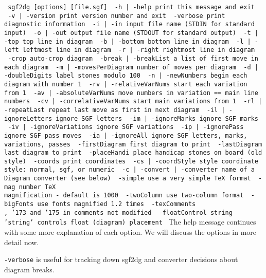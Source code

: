 \bigbreak
{\tt\parskip=0pt\parindent=5pt\obeylines\obeyspaces\hsize=400pt
\def\[{{\char'173}}
\def\]{{\char'175}}
sgf2dg [options] [file.sgf]
\medskip
\ -h | -help                 print this message and exit
\ -v | -version              print version number and exit
\ -verbose                   print diagnostic information
\ -i | -in                   input file name (STDIN for standard input)
\ -o | -out                  output file name (STDOUT for standard output)
\ -t | -top                  top line in diagram
\ -b | -bottom               bottom line in diagram
\ -l | -left                 leftmost line in diagram
\ -r | -right                rightmost line in diagram
\ -crop                      auto-crop diagram
\ -break | -breakList        a list of first move in each diagram
\ -m | -movesPerDiagram      number of moves per diagram
\ -d | -doubleDigits         label stones modulo 100
\ -n | -newNumbers           begin each diagram with number 1
\ -rv | -relativeVarNums     start each variation from 1
\ -av | -absoluteVarNums     move numbers in variation == main line numbers
\ -cv | -correlativeVarNums  start main variations from 1 
\ -rl | -repeatLast          repeat last move as first in next diagram
\ -il | -ignoreLetters       ignore SGF letters
\ -im | -ignoreMarks         ignore SGF marks
\ -iv | -ignoreVariations    ignore SGF variations
\ -ip | -ignorePass          ignore SGF pass moves
\ -ia | -ignoreAll           ignore SGF letters, marks, variations, passes
\ -firstDiagram              first diagram to print
\ -lastDiagram               last diagram to print
\ -placeHandi                place handicap stones on board (old style)
\ -coords                    print coordinates
\ -cs | -coordStyle style    coordinate style: normal, sgf, or numeric
\ -c | -convert | -converter name of a Diagram converter (see below)
\ -simple                    use a very simple TeX format
\ -mag number                TeX \\magnification - default is 1000
\ -twoColumn                 use two-column format
\ -bigFonts                  use fonts magnified 1.2 times
\ -texComments               \\, \[ and \] in comments not modified
\ -floatControl string       'string' controls float (diagram) placement
}
\bigbreak
The help message continues with some more explanation of each option.
We will discuss the options in more detail now.

{\tt -verbose} is useful for tracking down sgf2dg and converter decisions
about diagram breaks.

